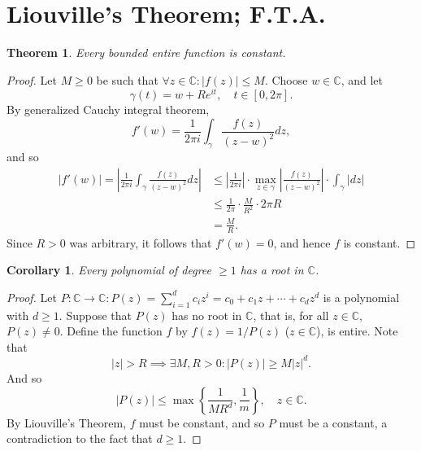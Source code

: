 \documentclass[12pt,openany]{book}
\newtheorem{theorem}{Theorem}[chapter]
\newtheorem{corollary}{Corollary}[theorem]
\theoremstyle{definition}
\newcommand{\set}[1]{\left\{#1\right\}}
\newcommand{\C}{\mathbb{C}}
\newcommand{\of}[1]{\left( #1 \right)}
\newcommand{\abs}[1]{\left\lvert #1 \right\rvert}
\begin{document}
	\section{Liouville's Theorem; F.T.A.}
	\begin{tcolorbox}[colback=white,colframe=thmcolor,arc=5pt,title={\color{white}\bf Liouville's Theorem}]
		\begin{theorem}
			Every bounded entire function is constant.
		\end{theorem}
	\end{tcolorbox}
	\begin{proof}
		Let $M\geq 0$ be such that $\forall z\in\C:\abs{f\of{z}}\leq M$. Choose $w\in\C$, and let \[
		\gamma\of{t}=w+Re^{it},\quad t\in[0,2\pi].
		\] By generalized Cauchy integral theorem, \[
		f'\of{w}=\frac{1}{2\pi i}\int_\gamma\frac{f\of{z}}{\of{z-w}^2}dz,
		\] and so \begin{align*}
			\abs{f'\of{w}}=\abs{\frac{1}{2\pi i}\int_\gamma\frac{f\of{z}}{\of{z-w}^2}dz}&\leq\abs{\frac{1}{2\pi i}}\cdot\max_{z\in\gamma}\abs{\frac{f\of{z}}{\of{z-w}^2}}\cdot\int_\gamma\abs{dz}\\
			&\leq\frac{1}{2\pi}\cdot\frac{M}{R^2}\cdot 2\pi R\\
			&=\frac{M}{R}.
		\end{align*} Since $R>0$ was arbitrary, it follows that $f'\of{w}=0$, and hence $f$ is constant.
	\end{proof}
	
	\begin{tcolorbox}[colback=white,colframe=corcolor,arc=5pt,title={\color{white}\bf Fundamental Theorem of Algebra}]
		\begin{corollary}
			Every polynomial of degree $\geq 1$ has a root in $\C$.
		\end{corollary}
	\end{tcolorbox}
	\begin{proof}
		Let $P:\C\to\C:P\of{z}=\sum_{i=1}^d c_iz^i=c_0+c_1z+\cdots+c_dz^d$ is a polynomial with $d\geq 1$. Suppose that $P(z)$ has no root in $\C$, that is, for all $z\in\C$, $P\of{z}\neq 0$. Define the function $f$ by $f\of{z}=1/P\of{z}$ ($z\in\C$), is entire. Note that \[
		\abs{z}>R\implies\exists M,R>0:\abs{P\of{z}}\geq M\abs{z}^d.
		\] And so \[
		\abs{P\of{z}}\leq\max\set{\frac{1}{MR^d},\frac{1}{m}},\quad z\in\C.
		\] By Liouville's Theorem, $f$ must be constant, and so $P$ must be a constant, a contradiction to the fact that $d\geq 1$.
	\end{proof}
	
	\newpage
\end{document}
